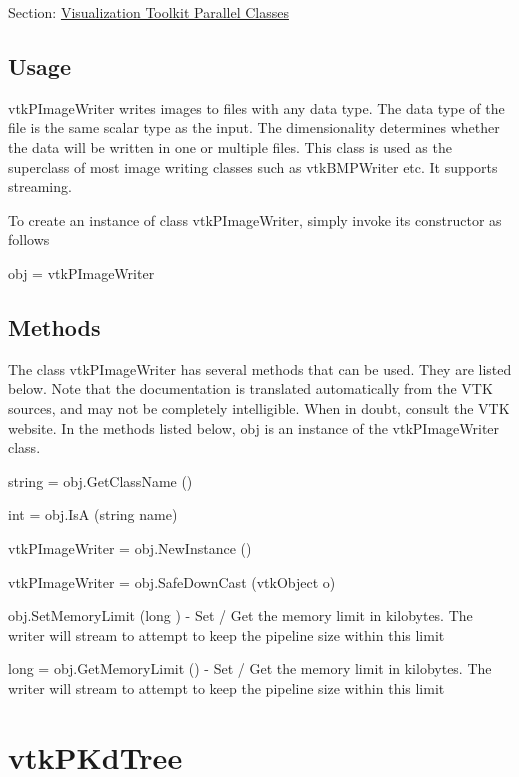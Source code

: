 Section\-: \hyperlink{sec_vtkparallel}{Visualization Toolkit Parallel Classes} \hypertarget{vtkwidgets_vtkxyplotwidget_Usage}{}\subsection{Usage}\label{vtkwidgets_vtkxyplotwidget_Usage}
vtk\-P\-Image\-Writer writes images to files with any data type. The data type of the file is the same scalar type as the input. The dimensionality determines whether the data will be written in one or multiple files. This class is used as the superclass of most image writing classes such as vtk\-B\-M\-P\-Writer etc. It supports streaming.

To create an instance of class vtk\-P\-Image\-Writer, simply invoke its constructor as follows \begin{DoxyVerb}  obj = vtkPImageWriter
\end{DoxyVerb}
 \hypertarget{vtkwidgets_vtkxyplotwidget_Methods}{}\subsection{Methods}\label{vtkwidgets_vtkxyplotwidget_Methods}
The class vtk\-P\-Image\-Writer has several methods that can be used. They are listed below. Note that the documentation is translated automatically from the V\-T\-K sources, and may not be completely intelligible. When in doubt, consult the V\-T\-K website. In the methods listed below, {\ttfamily obj} is an instance of the vtk\-P\-Image\-Writer class. 
\begin{DoxyItemize}
\item {\ttfamily string = obj.\-Get\-Class\-Name ()}  
\item {\ttfamily int = obj.\-Is\-A (string name)}  
\item {\ttfamily vtk\-P\-Image\-Writer = obj.\-New\-Instance ()}  
\item {\ttfamily vtk\-P\-Image\-Writer = obj.\-Safe\-Down\-Cast (vtk\-Object o)}  
\item {\ttfamily obj.\-Set\-Memory\-Limit (long )} -\/ Set / Get the memory limit in kilobytes. The writer will stream to attempt to keep the pipeline size within this limit  
\item {\ttfamily long = obj.\-Get\-Memory\-Limit ()} -\/ Set / Get the memory limit in kilobytes. The writer will stream to attempt to keep the pipeline size within this limit  
\end{DoxyItemize}\hypertarget{vtkparallel_vtkpkdtree}{}\section{vtk\-P\-Kd\-Tree}\label{vtkparallel_vtkpkdtree}
